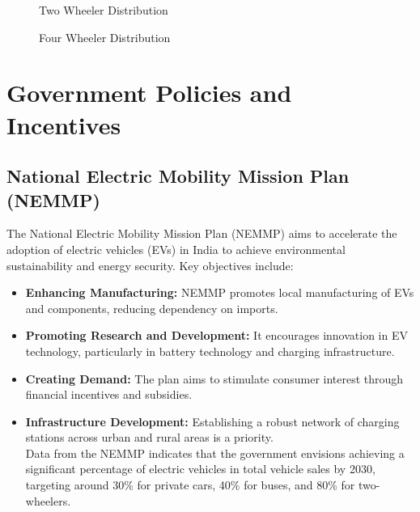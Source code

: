 \documentclass[a4paper,12pt]{report}
\begin{document}
\begin{figure}[h!]
    \centering
    \caption{Two Wheeler Distribution}
\end{figure}
\begin{figure}[h!]
    \centering
    \caption{Four Wheeler Distribution}
\end{figure}






\chapter{Government Policies and Incentives}
\section{National Electric Mobility Mission Plan (NEMMP)\cite{nemmp}}
The National Electric Mobility Mission Plan (NEMMP) aims to accelerate the adoption of electric vehicles (EVs) in India to achieve environmental sustainability and energy security. Key objectives include:
\begin{itemize}
    \item \textbf{Enhancing Manufacturing:}
    NEMMP promotes local manufacturing of EVs and components, reducing dependency on imports.

    \item \textbf{Promoting Research and Development:}
    It encourages innovation in EV technology, particularly in battery technology and charging infrastructure.

    \item \textbf{Creating Demand:}
    The plan aims to stimulate consumer interest through financial incentives and subsidies.

    \item \textbf{Infrastructure Development:}
    Establishing a robust network of charging stations across urban and rural areas is a priority.
    \\
    Data from the NEMMP indicates that the government envisions achieving a significant percentage of electric vehicles in total vehicle sales by 2030, targeting around 30\% for private cars, 40\% for buses, and 80\% for two-wheelers.
    
\end{itemize}
\end{document}

